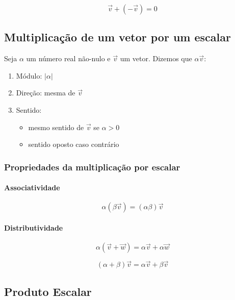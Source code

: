 \[
\vec{v} + (-\vec{v}) = 0
\]

\subsection{Multiplicação de um vetor por um
escalar}\label{multiplicauxe7uxe3o-de-um-vetor-por-um-escalar}

Seja $\alpha$ um número real não-nulo e $\vec{v}$ um vetor. Dizemos que
$\alpha \vec{v}$:

\begin{enumerate}
\def\labelenumi{\arabic{enumi}.}
\itemsep1pt\parskip0pt
\item
  Módulo: $|\alpha|$
\item
  Direção: mesma de $\vec{v}$
\item
  Sentido:

  \begin{itemize}
  \itemsep1pt\parskip0pt
  \item
    mesmo sentido de $\vec{v}$ se $\alpha > 0$
  \item
    sentido oposto caso contrário
  \end{itemize}
\end{enumerate}

\subsubsection{Propriedades da multiplicação por
escalar}\label{propriedades-da-multiplicauxe7uxe3o-por-escalar}

\paragraph{Associatividade}\label{associatividade-1}

\[
\alpha (\beta \vec{v}) = (\alpha \beta) \vec{v}
\]

\paragraph{Distributividade}\label{distributividade}

\[
\alpha (\vec{v} + \vec{w}) = \alpha \vec{v} + \alpha \vec{w}
\]

\[
(\alpha + \beta) \vec{v} = \alpha \vec{v} + \beta \vec{v}
\]

\subsection{Produto Escalar}\label{produto-escalar}

